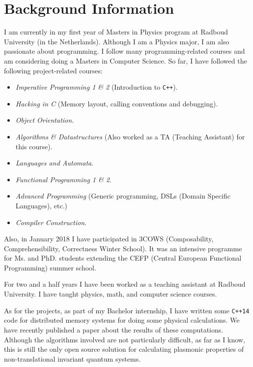 \documentclass[a4paper,12pt]{article}
\begin{document}
\section*{Background Information}
    I am currently in my first year of Masters in Physics program at Radboud
    University (in the Netherlands). Although I am a Physics major, I am also
    passionate about programming. I follow many programming-related courses
    and am considering doing a Masters in Computer Science. So far, I have
    followed the following project-related courses:
    \begin{itemize}
        \item \textit{Imperative Programming 1 \& 2} (Introduction to \texttt{C++}).
        \item \textit{Hacking in C} (Memory layout, calling conventions and
            debugging).
        \item \textit{Object Orientation}.
        \item \textit{Algorithms \& Datastructures} (Also worked as a
            TA (Teaching Assistant) for this course).
        \item \textit{Languages and Automata}.
        \item \textit{Functional Programming 1 \& 2}.
        \item \textit{Advanced Programming} (Generic programming, DSLs (Domain
            Specific Languages), etc.)
        \item \textit{Compiler Construction}.
    \end{itemize}

    Also, in January 2018 I have participated in 3COWS (Composability,
    Comprehensibility, Correctness Winter School). It was an intensive programme
    for Ms. and PhD. students extending the CEFP (Central European Functional
    Programming) summer school.

    For two and a half years I have been worked as a teaching assistant at
    Radboud University. I have taught physics, math, and computer science
    courses.

    As for the projects, as part of my Bachelor internship\cite{bachelor2017}, I
    have written some \texttt{C++14} code\cite{plasmon-cpp} for distributed
    memory systems for doing some physical calculations. We have recently
    published a paper\cite{westerhout2018plasmon} about the results of these
    computations. Although the algorithms involved are not particularly
    difficult, as far as I know, this is still the only open source solution for
    calculating plasmonic properties of non-translational invariant quantum
    systems.
\end{document}
